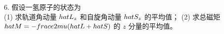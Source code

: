 6. 假设一氢原子的状态为
\\[\\psi = \\begin{pmatrix}\\frac{1}{4} R_{32}(r) Y_{21}(\\theta, \\varphi) \\\\\\frac{\\sqrt{15}}{4} R_{32}(r) Y_{2-1}(\\theta, \\varphi)\\end{pmatrix}\\]
(1) 求轨道角动量 $\\hat{L}_z$ 和自旋角动量 $\\hat{S}_z$ 的平均值；
(2) 求总磁矩 $\\hat{M} = -\\frac{e}{2\\mu} (\\hat{L} + \\hat{S})$ 的 $z$ 分量的平均值。
